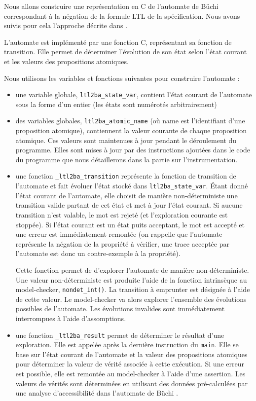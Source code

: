 Nous allons construire une représentation en C de l'automate de Büchi
correspondant à la négation de la formule LTL de la spécification. Nous
avons suivis pour cela l'approche décrite dans \cite{morse_ltl}.

L'automate est implémenté par une fonction C, représentant sa fonction
de transition. Elle permet de déterminer l'évolution de son état selon
l'état courant et les valeurs des propositions atomiques.

Nous utilisons les variables et fonctions suivantes pour construire
l'automate :

\begin{itemize}
\item
  une variable globale, \texttt{ltl2ba\_state\_var}, contient l'état
  courant de l'automate sous la forme d'un entier (les états sont
  numérotés arbitrairement)
\item
  des variables globales, \texttt{ltl2ba\_atomic\_{name}} (où name est
  l'identifiant d'une proposition atomique), contiennent la valeur
  courante de chaque proposition atomique. Ces valeurs sont maintenues à
  jour pendant le déroulement du programme. Elles sont mises à jour par
  des instructions ajoutées dans le code du programme que nous
  détaillerons dans la partie sur l'instrumentation.
\item
  une fonction \texttt{\_ltl2ba\_transition} représente la fonction de
  transition de l'automate et fait évoluer l'état stocké dans
  \texttt{ltl2ba\_state\_var}. Étant donné l'état courant de
  l'automate, elle choisit de manière non-déterministe une transition
  valide partant de cet état et met à jour l'état courant. Si aucune
  transition n'est valable, le mot est rejeté (et l'exploration courante
  est stoppée). Si l'état courant est un état puits acceptant, le mot
  est accepté et une erreur est immédiatement remontée (on rappelle que
  l'automate représente la négation de la propriété à vérifier, une
  trace acceptée par l'automate est donc un contre-exemple à la
  propriété).

  Cette fonction permet de d'explorer l'automate de manière
  non-déterministe. Une valeur non-déterministe est produite l'aide de
  la fonction intrinsèque au model-checker, \texttt{nondet\_int()}. La
  transition à emprunter est désignée à l'aide de cette valeur. Le
  model-checker va alors explorer l'ensemble des évolutions possibles de
  l'automate. Les évolutions invalides sont immédiatement interrompues à
  l'aide d'assomptions.
\item
  une fonction \texttt{\_ltl2ba\_result} permet de déterminer le
  résultat d'une exploration. Elle est appelée après la dernière
  instruction du \texttt{main}. Elle se base sur l'état courant de
  l'automate et la valeur des propositions atomiques pour déterminer la
  valeur de vérité associée à cette exécution. Si une erreur est
  possible, elle est remontée au model-checker à l'aide d'une assertion.
  Les valeurs de vérités sont déterminées en utilisant des données
  pré-calculées par une analyse d'accessibilité dans l'automate de Büchi
  \cite{morse_ltl}.
\end{itemize}

